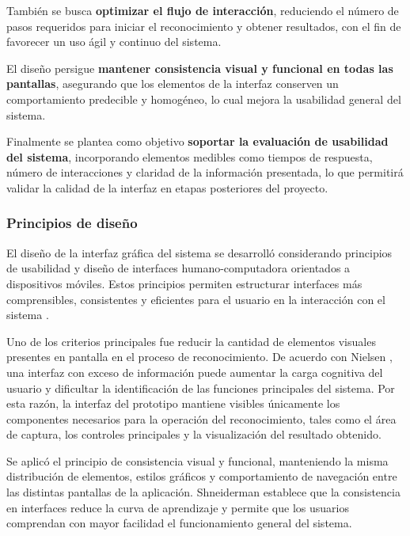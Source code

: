 	También se busca \textbf{optimizar el flujo de interacción}, 
	reduciendo el número de pasos requeridos para iniciar el reconocimiento y obtener resultados, con el fin de favorecer un uso ágil y continuo del sistema.
	
	El diseño persigue \textbf{mantener consistencia visual y
	funcional en todas las pantallas}, asegurando que los elementos de la interfaz conserven un comportamiento predecible y homogéneo, lo cual mejora la usabilidad general del sistema.
	
	Finalmente se plantea como objetivo \textbf{soportar la evaluación de 
	usabilidad del sistema}, incorporando elementos medibles como tiempos de respuesta, número de interacciones y claridad de la información presentada, lo que permitirá validar la calidad de la interfaz en etapas posteriores del proyecto.
	
	\subsubsection{Principios de diseño}
	
	El diseño de la interfaz gráfica del sistema se desarrolló considerando principios
	de usabilidad y diseño de interfaces humano-computadora orientados a dispositivos
	móviles. Estos principios permiten estructurar interfaces más comprensibles,
	consistentes y eficientes para el usuario en la interacción con el sistema
	\cite{nielsen1994usability,shneiderman2016designing,norman2013design}.
	
	Uno de los criterios principales fue reducir la cantidad de elementos visuales
	presentes en pantalla en el proceso de reconocimiento. De acuerdo con Nielsen
	\cite{nielsen1994usability}, una interfaz con exceso de información puede aumentar
	la carga cognitiva del usuario y dificultar la identificación de las funciones
	principales del sistema. Por esta razón, la interfaz del prototipo mantiene visibles
	únicamente los componentes necesarios para la operación del reconocimiento, tales
	como el área de captura, los controles principales y la visualización del resultado
	obtenido.
	
	Se aplicó el principio de consistencia visual y funcional, manteniendo
	la misma distribución de elementos, estilos gráficos y comportamiento de navegación
	entre las distintas pantallas de la aplicación. Shneiderman
	\cite{shneiderman2016designing} establece que la consistencia en interfaces reduce
	la curva de aprendizaje y permite que los usuarios comprendan con mayor facilidad
	el funcionamiento general del sistema.
	
